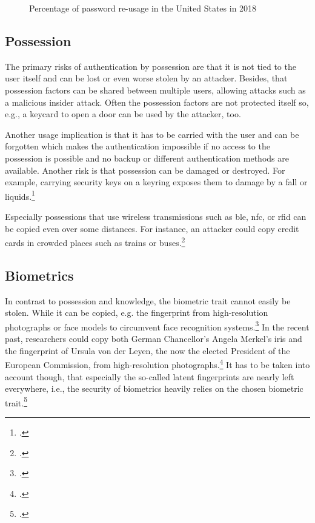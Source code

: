 \begin{figure}
	\begin{bchart}[min=5, max=55, step=10, unit=\%, width=.65\textwidth]
		\medskip
		\medskip
		\bigskip
		\bigskip
	\end{bchart}
	\caption{Percentage of password re-usage in the United States in 2018}
	\label{fig:us-password-reuse}
\end{figure}

	
\subsection{Possession}
\label{subsec:possession-threat}

The primary risks of authentication by possession are that it is not tied to the user itself and can be lost or even worse stolen by an attacker. Besides, that possession factors can be shared between multiple users, allowing attacks such as a malicious insider attack. Often the possession factors are not protected itself so, e.g., a keycard to open a door can be used by the attacker, too.

Another usage implication is that it has to be carried with the user and can be forgotten which makes the authentication impossible if no access to the possession is possible and no backup or different authentication methods are available. Another risk is that possession can be damaged or destroyed. For example, carrying security keys on a keyring exposes them to damage by a fall or liquids.\footcites[See][263--264]{shostack2014threat}

Especially possessions that use wireless transmissions such as \gls{ble}, \gls{nfc}, or \gls{rfid} can be copied even over some distances. For instance, an attacker could copy credit cards in crowded places such as trains or buses.\footcite{6892730}

\subsection{Biometrics}

In contrast to possession and knowledge, the biometric trait cannot easily be stolen. While it can be copied, e.g. the fingerprint from high-resolution photographs or 
face models to circumvent face recognition systems.\footcites[][]{185181}[][]{220566} In the recent past, researchers could copy both German Chancellor's Angela Merkel's iris and the fingerprint of Ursula von der Leyen, the now the elected President of the European Commission, from high-resolution photographs.\footcite{ccc-merkel} It has to be taken into account though, that especially the so-called latent fingerprints are nearly left everywhere, i.e., the security of biometrics heavily relies on the chosen biometric trait.\footcite[See][299]{Vacca2017aa}

